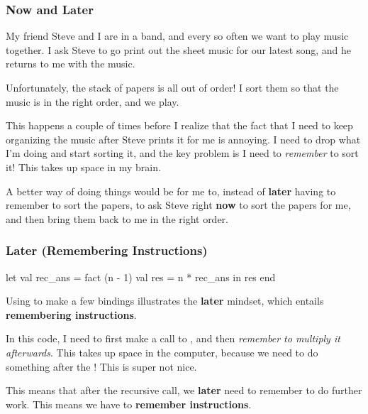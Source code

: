 \documentclass[aspectratio=169]{beamer}
\begin{document}
\begin{frame}[fragile]
  \frametitle{Now and Later}

  My friend Steve and I are in a band, and every so often we want to play music
  together. I ask Steve to go print out the sheet music for our latest song,
  and he returns to me with the music.

  \vspace{\fill}

  Unfortunately, the stack of papers is all out of order! I sort them so that the
  music is in the right order, and we play.

  \vspace{\fill}

  This happens a couple of times before I realize that the fact that I need to keep
  organizing the music after Steve prints it for me is annoying. I need to drop
  what I'm doing and start sorting it, and the key problem is I need to \textit{remember}
  to sort it! This takes up space in my brain. 

  \vspace{\fill}

  A better way of doing things would be for me to, instead of \textbf{later}
  having to remember to sort the papers, to ask Steve right \textbf{now} to 
  sort the papers for me, and then bring them back to me in the right order. 
\end{frame}

\begin{frame}[fragile]
  \frametitle{Later (Remembering Instructions)}

  \begin{codeblock}
    let 
      val rec_ans = fact (n - 1) 
      val res = n * rec_ans
    in
      res
    end
  \end{codeblock}

  Using  to make a few bindings illustrates the \textbf{later} mindset,
  which entails \textbf{remembering instructions}.

  \vspace{\fill}

  In this code, I need to first make a call to , and then
  \textit{remember to multiply it afterwards}. This takes up space in the computer,
  because we need to do something after the ! This is super not nice.

  \vspace{\fill}

  This means that after the recursive call, we \textbf{later} need to remember to
  do further work. This means we have to \textbf{remember instructions}. 
\end{frame}
\end{document}
